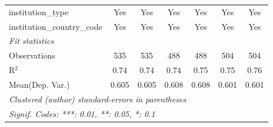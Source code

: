 \begin{tabular}{lcccccc}
   institution\_type                  & Yes     & Yes     & Yes     & Yes     & Yes     & Yes\\  
   institution\_country\_code         & Yes     & Yes     & Yes     & Yes     & Yes     & Yes\\  
   \midrule
   \emph{Fit statistics}\\
   Observations                       & 535     & 535     & 488     & 488     & 504     & 504\\  
   R$^2$                              & 0.74    & 0.74    & 0.74    & 0.75    & 0.75    & 0.76\\  
Mean(Dep. Var.) & 0.605 & 0.605 & 0.608 & 0.608 & 0.601 & 0.601 \\
   \midrule \midrule
   \multicolumn{7}{l}{\emph{Clustered (author) standard-errors in parentheses}}\\
   \multicolumn{7}{l}{\emph{Signif. Codes: ***: 0.01, **: 0.05, *: 0.1}}\\
\end{tabular}
\par\endgroup
